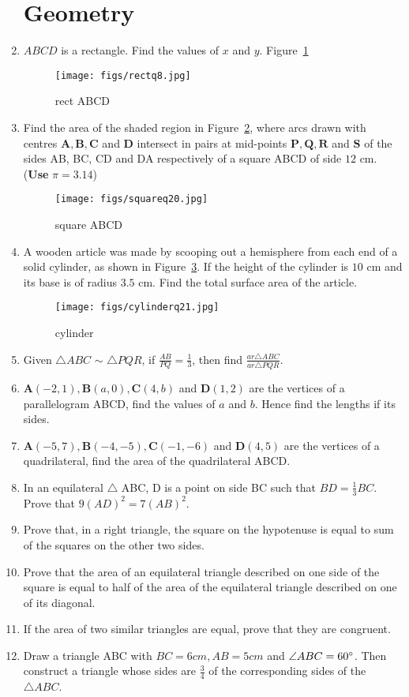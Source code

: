 \documentclass{article}
\let\vec\mathbf
\newcommand{\figref}[1]{Figure~\ref{#1}}
\begin{document}
\begin{enumerate}
	\section{Geometry}
	\item $ABCD$ is a rectangle. Find the values of $x$ and $y$.
		\figref{fig:Fig1}
	\begin{figure}[H]
		\centering
		\texttt{[image: figs/rectq8.jpg]}
		\caption{rect ABCD}
		\label{fig:Fig1}
	\end{figure}
\item Find the area of the shaded region in \figref{fig:Fig2}, where arcs drawn with centres $\vec{A,B,C}$ and $\vec{D}$ intersect in pairs at mid-points $\vec{P, Q, R}$ and $\vec{S}$ of the sides AB, BC, CD and DA respectively of a square ABCD of side $12$ cm. ({\textbf{Use}}  $\pi  = 3.14  $)
	\begin{figure}[H]
		\centering
		\texttt{[image: figs/squareq20.jpg]}
		\caption{square ABCD}
		\label{fig:Fig2}
	\end{figure}
\item A wooden article was made by scooping out a hemisphere from each end of a solid cylinder, as shown in \figref{fig:Fig3}. If the height of the cylinder is $10$ cm and its base is of radius $3.5$ cm. Find the total surface area of the article.
	
	\begin{figure}[H]
		\centering
		\texttt{[image: figs/cylinderq21.jpg]}
		\caption{cylinder}
		\label{fig:Fig3}
	\end{figure} 
	\item Given $\triangle ABC$ $\sim$  $\triangle PQR$, if $\frac{AB}{PQ} = \frac{1}{3}$, then find $\frac{ar \triangle ABC}{ar \triangle PQR}$.
	\item $\vec{A}(-2,1), \vec{B}(a,0), \vec{C}(4,b)$ and  $\vec{D}(1,2)$ are the vertices of a parallelogram {ABCD}, find the values of $a$ and $b$. Hence find the lengths if its sides.
	\item $\vec{A}(-5,7), \vec{B}(-4,-5), \vec{C}(-1,-6)$ and $\vec{D}(4,5)$ are the vertices of a quadrilateral, find the area of the quadrilateral ABCD.
	\item In an equilateral $\triangle$ ABC, D is a point on side BC such that $ BD =\frac{1}{3}BC$. Prove that $9(AD)^2 = 7(AB)^2$.
	\item Prove that, in a right triangle, the  square on the hypotenuse is equal to sum of the squares on the other two sides.
	\item Prove that the area of an equilateral triangle described on one side of the square is equal to half of the area of the equilateral triangle described on one of its diagonal.
	\item If the area of two similar triangles are equal, prove that they are congruent.
	\item Draw a triangle ABC with $BC=6 cm, AB=5 cm$ and $\angle{ABC}=60\degree$. Then construct a triangle whose sides are $\frac{3}{4}$ of the corresponding sides of the $\triangle ABC$.

\end{enumerate}
\end{document}
